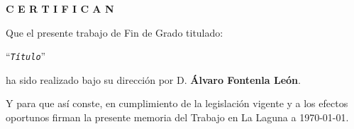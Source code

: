 \documentclass[english,a4paper,12pt,oneside]{extreport}
\newcommand{\TitleTopic}{\texttt{Título}}
\begin{document}
\bigskip

\bigskip
\bigskip
{\bf C E R T I F I C A N}

\bigskip
\bigskip
\bigskip
Que el presente trabajo de Fin de Grado titulado:

\bigskip
``{\it \TitleTopic{}}''

\bigskip
\bigskip
\bigskip
\noindent ha sido realizado bajo su dirección por D. {\bf Álvaro Fontenla León}.

\bigskip
\bigskip

Y para que así conste, en cumplimiento de la legislación vigente y a los efectos
oportunos firman la presente memoria del Trabajo en La Laguna a {\today}.

\newpage
\thispagestyle{empty}
\end{document}
